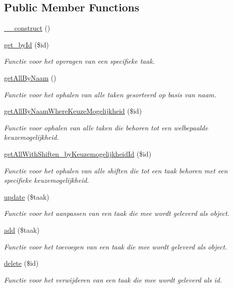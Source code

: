 \subsection*{Public Member Functions}
\begin{DoxyCompactItemize}
\item 
\mbox{\hyperlink{class_taken___model_a095c5d389db211932136b53f25f39685}{\+\_\+\+\_\+construct}} ()
\item 
\mbox{\hyperlink{class_taken___model_a98d28a4d9a29d40c5a8aa0176f19a919}{get\+\_\+by\+Id}} (\$id)
\begin{DoxyCompactList}\small\item\em Functie voor het opvragen van een specifieke taak. \end{DoxyCompactList}\item 
\mbox{\hyperlink{class_taken___model_a2b035b1ffd1cbe651b35bb3e53d72c09}{get\+All\+By\+Naam}} ()
\begin{DoxyCompactList}\small\item\em Functie voor het ophalen van alle taken gesorteerd op basis van naam. \end{DoxyCompactList}\item 
\mbox{\hyperlink{class_taken___model_a6f3e4d26ab480501524eabb01683f5f7}{get\+All\+By\+Naam\+Where\+Keuze\+Mogelijkheid}} (\$id)
\begin{DoxyCompactList}\small\item\em Functie voor ophalen van alle taken die behoren tot een welbepaalde keuzemogelijkheid. \end{DoxyCompactList}\item 
\mbox{\hyperlink{class_taken___model_a43d1fa46aefbe64343373fac217d6bdb}{get\+All\+With\+Shiften\+\_\+by\+Keuzemogelijkheid\+Id}} (\$id)
\begin{DoxyCompactList}\small\item\em Functie voor het ophalen van alle shiften die tot een taak behoren met een specifieke keuzemogelijkheid. \end{DoxyCompactList}\item 
\mbox{\hyperlink{class_taken___model_a2fdc722cb2e60f87bc93a5f2390f88bc}{update}} (\$taak)
\begin{DoxyCompactList}\small\item\em Functie voor het aanpassen van een taak die mee wordt geleverd als object. \end{DoxyCompactList}\item 
\mbox{\hyperlink{class_taken___model_ab4986b088d8f7831b9a8dce8e97485bb}{add}} (\$taak)
\begin{DoxyCompactList}\small\item\em Functie voor het toevoegen van een taak die mee wordt geleverd als object. \end{DoxyCompactList}\item 
\mbox{\hyperlink{class_taken___model_a2f8258add505482d7f00ea26493a5723}{delete}} (\$id)
\begin{DoxyCompactList}\small\item\em Functie voor het verwijderen van een taak die mee wordt geleverd als id. \end{DoxyCompactList}\end{DoxyCompactItemize}


